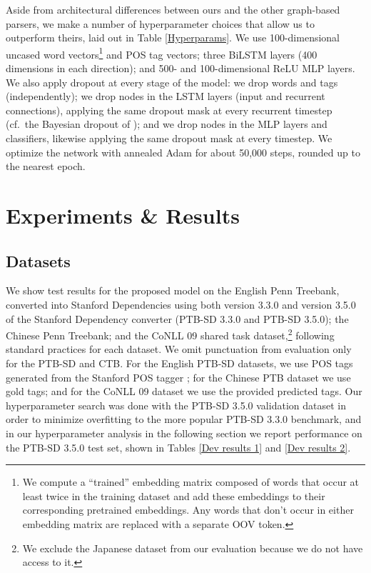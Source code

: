 \documentclass[11pt,a4paper]{article}
\begin{document}
Aside from architectural differences between ours and the other graph-based parsers, we make a number of hyperparameter choices that allow us to outperform theirs, laid out in Table \ref{Hyperparams}. We use 100-dimensional uncased word vectors\footnote{We compute a ``trained'' embedding matrix composed of words that occur at least twice in the training dataset and add these embeddings to their corresponding pretrained embeddings. Any words that don't occur in either embedding matrix are replaced with a separate OOV token.} and POS tag vectors; three BiLSTM layers (400 dimensions in each direction); and 500- and 100-dimensional ReLU MLP layers. We also apply dropout at every stage of the model: we drop words and tags (independently); we drop nodes in the LSTM layers (input and recurrent connections), applying the same dropout mask at every recurrent timestep (cf.\ the Bayesian dropout of \citet{GalGhaharmani2015}); and we drop nodes in the MLP layers and classifiers, likewise applying the same dropout mask at every timestep. We optimize the network with annealed Adam \citep{KingmaBa2014} for about 50,000 steps, rounded up to the nearest epoch.

\section{Experiments \&{} Results}
\subsection{Datasets}
We show test results for the proposed model on the English Penn Treebank, converted into Stanford Dependencies using both version 3.3.0 and version 3.5.0 of the Stanford Dependency converter (PTB-SD 3.3.0 and PTB-SD 3.5.0); the Chinese Penn Treebank; and the CoNLL 09 shared task dataset,\footnote{We exclude the Japanese dataset from our evaluation because we do not have access to it.} following standard practices for each dataset. We omit punctuation from evaluation only for the PTB-SD and CTB. For the English PTB-SD datasets, we use POS tags generated from the Stanford POS tagger \citep{Toutanovaetal2003}; for the Chinese PTB dataset we use gold tags; and for the CoNLL 09 dataset we use the provided predicted tags. Our hyperparameter search was done with the PTB-SD 3.5.0 validation dataset in order to minimize overfitting to the more popular PTB-SD 3.3.0 benchmark, and in our hyperparameter analysis in the following section we report performance on the PTB-SD 3.5.0 test set, shown in Tables \ref{Dev results 1} and \ref{Dev results 2}.
\end{document}
